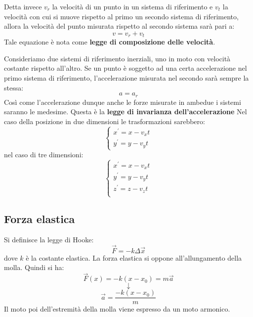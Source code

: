 \documentclass[a4paper,12pt, oneside]{book}
\begin{document}
Detta invece $v_r$ la velocità di un punto in un sistema di riferimento e $v_t$ la velocità con cui si muove rispetto al primo un secondo sistema di riferimento, allora la velocità del punto misurata rispetto al secondo sistema sarà pari a:
$$v=v_r+v_t$$
Tale equazione è nota come \textbf{legge di composizione delle velocità}.


Consideriamo due sistemi di riferimento inerziali, uno in moto con velocità costante rispetto all'altro. Se un punto è soggetto ad una certa accelerazione nel primo sistema di riferimento, l'accelerazione misurata nel secondo sarà sempre la stessa:
$$a=a_r$$
Così come l'accelerazione dunque anche le forze misurate in ambedue i sistemi saranno le medesime. Questa è la \textbf{legge di invarianza dell'accelerazione}
Nel caso della posizione in due dimensioni le trasformazioni sarebbero:
$$\begin{cases}
		x^{'}=x-v_xt \\
		y^{'}=y-v_yt
	\end{cases}$$
nel caso di tre dimensioni:
$$\begin{cases}
		x^{'}=x-v_xt \\
		y^{'}=y-v_yt \\
		z^{'}=z-v_zt \\
	\end{cases}$$

\subsection{Forza elastica}
Si definisce la legge di Hooke:
$$\vec{F}=-k\Delta \vec{x}$$
dove $k$ è la costante elastica. La forza elastica si oppone all'allungamento della molla. Quindi si ha:
$$\vec{F}(x)=-k(x-x_0)=m\vec{a}$$
$$\downarrow$$
$$\vec{a}=\frac{-k(x-x_0)}{m}$$
Il moto poi dell'estremità della molla viene espresso da un moto armonico.
\end{document}
